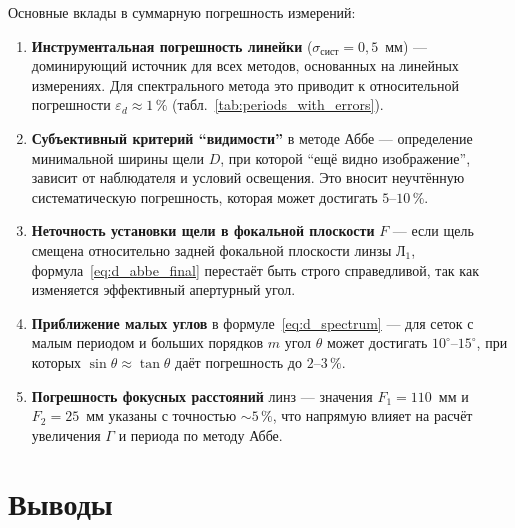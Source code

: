 \documentclass[a4paper]{article}
\begin{document}
Основные вклады в суммарную погрешность измерений:
\begin{enumerate}
    \item \textbf{Инструментальная погрешность линейки} ($\sigma_{\text{сист}} = 0{,}5$~мм) --- доминирующий источник для всех методов, основанных на линейных измерениях. Для спектрального метода это приводит к относительной погрешности $\varepsilon_d \approx 1\,\%$ (табл.~\ref{tab:periods_with_errors}).
    
    \item \textbf{Субъективный критерий ``видимости''} в методе Аббе --- определение минимальной ширины щели $D$, при которой ``ещё видно изображение'', зависит от наблюдателя и условий освещения. Это вносит неучтённую систематическую погрешность, которая может достигать $5$--$10\,\%$.
    
    \item \textbf{Неточность установки щели в фокальной плоскости} $F$ --- если щель смещена относительно задней фокальной плоскости линзы Л$_1$, формула~\eqref{eq:d_abbe_final} перестаёт быть строго справедливой, так как изменяется эффективный апертурный угол.
    
    \item \textbf{Приближение малых углов} в формуле~\eqref{eq:d_spectrum} --- для сеток с малым периодом и больших порядков $m$ угол $\theta$ может достигать $10^\circ$--$15^\circ$, при которых $\sin\theta \approx \tan\theta$ даёт погрешность до $2$--$3\,\%$.
    
    \item \textbf{Погрешность фокусных расстояний} линз --- значения $F_1 = 110$~мм и $F_2 = 25$~мм указаны с точностью $\sim 5\,\%$, что напрямую влияет на расчёт увеличения $\Gamma$ и периода по методу Аббе.
\end{enumerate}

\section{Выводы}
\end{document}
